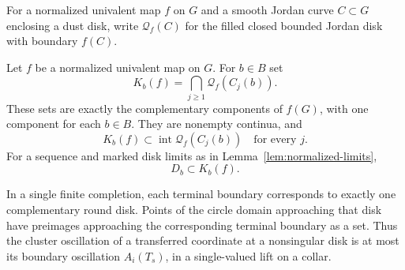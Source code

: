 For a normalized univalent map $f$ on $G$ and a smooth Jordan curve
$C\subset G$ enclosing a dust disk, write
$\mathcal Q_f(C)$ for the filled closed bounded Jordan disk with
boundary $f(C)$.

\begin{lemma}\label{lem:end-components}
Let $f$ be a normalized univalent map on $G$.  For $b\in B$ set
\begin{equation}\label{eq:transfer-end-component}
 K_b(f)=\bigcap_{j\ge1}\mathcal Q_f(C_j(b)).
\end{equation}
These sets are exactly the complementary components of $f(G)$, with
one component for each $b\in B$.  They are nonempty continua, and
\[
 K_b(f)\subset\operatorname{int}\mathcal Q_f(C_j(b))
 \quad\text{for every }j.
\]
For a sequence and marked disk limits as in
Lemma~\ref{lem:normalized-limits},
\begin{equation}\label{eq:transfer-mark-trapping}
 D_b\subset K_b(f).
\end{equation}

In a single finite completion, each terminal boundary corresponds to
exactly one complementary round disk.  Points of the circle domain
approaching that disk have preimages approaching the corresponding
terminal boundary as a set.  Thus the cluster oscillation of a transferred
coordinate at a nonsingular disk is at most its boundary oscillation
$A_i(T_s)$, in a single-valued lift on a collar.
\end{lemma}

